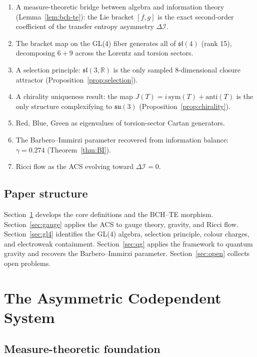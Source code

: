\documentclass[11pt,a4paper]{article}
\theoremstyle{plain}
\theoremstyle{definition}
\theoremstyle{remark}
\begin{document}
\begin{enumerate}[label=(\roman*)]
\item A measure-theoretic bridge between algebra and information theory
  (Lemma~\ref{lem:bch-te}): the Lie bracket $[f,g]$ is the exact
  second-order coefficient of the transfer entropy asymmetry $\Delta\mathcal{I}$.
\item The bracket map on the GL(4) fiber generates all of $\mathfrak{sl}(4)$
  (rank 15), decomposing $6+9$ across the Lorentz and torsion sectors.
\item A selection principle: $\mathfrak{sl}(3,\mathbb{R})$ is the only sampled
  8-dimensional closure attractor (Proposition~\ref{prop:selection}).
\item A chirality uniqueness result: the map $J(T) = i\,\mathrm{sym}(T) + \mathrm{anti}(T)$
  is the only structure complexifying to $\mathfrak{su}(3)$
  (Proposition~\ref{prop:chirality}).
\item Red, Blue, Green as eigenvalues of torsion-sector Cartan generators.
\item The Barbero--Immirzi parameter recovered from information balance:
  $\gamma = 0.274$ (Theorem~\ref{thm:BI}).
\item Ricci flow as the ACS evolving toward $\Delta\mathcal{I} = 0$.
\end{enumerate}

\subsection{Paper structure}
Section~\ref{sec:acs} develops the core definitions and the BCH--TE morphism.
Section~\ref{sec:gauge} applies the ACS to gauge theory, gravity, and Ricci flow.
Section~\ref{sec:gl4} identifies the GL(4) algebra, selection principle, colour charges,
and electroweak containment.
Section~\ref{sec:qg} applies the framework to quantum gravity and recovers
the Barbero--Immirzi parameter.
Section~\ref{sec:open} collects open problems.
\section{The Asymmetric Codependent System}
\label{sec:acs}

\subsection{Measure-theoretic foundation}
\end{document}
